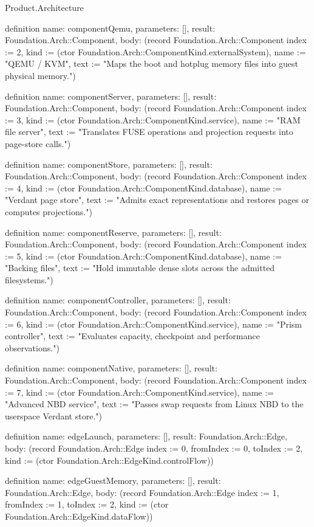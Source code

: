 \begin{lexlean}{Product.Architecture}
\begin{semanticmodule}
definition{
  name: componentQemu, parameters: [], result: Foundation.Arch::Component,
  body: (record Foundation.Arch::Component {index := 2, kind := (ctor Foundation.Arch::ComponentKind.externalSystem), name := "QEMU / KVM", text := "Maps the boot and hotplug memory files into guest physical memory."})
}

definition{
  name: componentServer, parameters: [], result: Foundation.Arch::Component,
  body: (record Foundation.Arch::Component {index := 3, kind := (ctor Foundation.Arch::ComponentKind.service), name := "RAM file server", text := "Translates FUSE operations and projection requests into page-store calls."})
}

definition{
  name: componentStore, parameters: [], result: Foundation.Arch::Component,
  body: (record Foundation.Arch::Component {index := 4, kind := (ctor Foundation.Arch::ComponentKind.database), name := "Verdant page store", text := "Admits exact representations and restores pages or computes projections."})
}

definition{
  name: componentReserve, parameters: [], result: Foundation.Arch::Component,
  body: (record Foundation.Arch::Component {index := 5, kind := (ctor Foundation.Arch::ComponentKind.database), name := "Backing files", text := "Hold immutable dense slots across the admitted filesystems."})
}

definition{
  name: componentController, parameters: [], result: Foundation.Arch::Component,
  body: (record Foundation.Arch::Component {index := 6, kind := (ctor Foundation.Arch::ComponentKind.service), name := "Prism controller", text := "Evaluates capacity, checkpoint and performance observations."})
}

definition{
  name: componentNative, parameters: [], result: Foundation.Arch::Component,
  body: (record Foundation.Arch::Component {index := 7, kind := (ctor Foundation.Arch::ComponentKind.service), name := "Advanced NBD service", text := "Passes swap requests from Linux NBD to the userspace Verdant store."})
}

definition{
  name: edgeLaunch, parameters: [], result: Foundation.Arch::Edge,
  body: (record Foundation.Arch::Edge {index := 0, fromIndex := 0, toIndex := 2, kind := (ctor Foundation.Arch::EdgeKind.controlFlow)})
}

definition{
  name: edgeGuestMemory, parameters: [], result: Foundation.Arch::Edge,
  body: (record Foundation.Arch::Edge {index := 1, fromIndex := 1, toIndex := 2, kind := (ctor Foundation.Arch::EdgeKind.dataFlow)})
}


\end{semanticmodule}
\end{lexlean}
